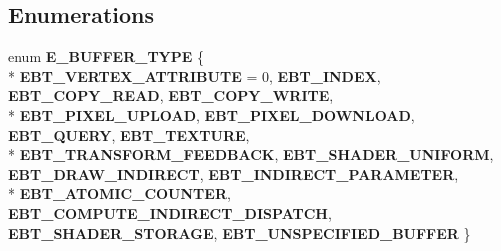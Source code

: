 \subsection*{Enumerations}
\begin{DoxyCompactItemize}
\item 
enum {\bfseries E\+\_\+\+B\+U\+F\+F\+E\+R\+\_\+\+T\+Y\+PE} \{ \\*
{\bfseries E\+B\+T\+\_\+\+V\+E\+R\+T\+E\+X\+\_\+\+A\+T\+T\+R\+I\+B\+U\+TE} = 0, 
{\bfseries E\+B\+T\+\_\+\+I\+N\+D\+EX}, 
{\bfseries E\+B\+T\+\_\+\+C\+O\+P\+Y\+\_\+\+R\+E\+AD}, 
{\bfseries E\+B\+T\+\_\+\+C\+O\+P\+Y\+\_\+\+W\+R\+I\+TE}, 
\\*
{\bfseries E\+B\+T\+\_\+\+P\+I\+X\+E\+L\+\_\+\+U\+P\+L\+O\+AD}, 
{\bfseries E\+B\+T\+\_\+\+P\+I\+X\+E\+L\+\_\+\+D\+O\+W\+N\+L\+O\+AD}, 
{\bfseries E\+B\+T\+\_\+\+Q\+U\+E\+RY}, 
{\bfseries E\+B\+T\+\_\+\+T\+E\+X\+T\+U\+RE}, 
\\*
{\bfseries E\+B\+T\+\_\+\+T\+R\+A\+N\+S\+F\+O\+R\+M\+\_\+\+F\+E\+E\+D\+B\+A\+CK}, 
{\bfseries E\+B\+T\+\_\+\+S\+H\+A\+D\+E\+R\+\_\+\+U\+N\+I\+F\+O\+RM}, 
{\bfseries E\+B\+T\+\_\+\+D\+R\+A\+W\+\_\+\+I\+N\+D\+I\+R\+E\+CT}, 
{\bfseries E\+B\+T\+\_\+\+I\+N\+D\+I\+R\+E\+C\+T\+\_\+\+P\+A\+R\+A\+M\+E\+T\+ER}, 
\\*
{\bfseries E\+B\+T\+\_\+\+A\+T\+O\+M\+I\+C\+\_\+\+C\+O\+U\+N\+T\+ER}, 
{\bfseries E\+B\+T\+\_\+\+C\+O\+M\+P\+U\+T\+E\+\_\+\+I\+N\+D\+I\+R\+E\+C\+T\+\_\+\+D\+I\+S\+P\+A\+T\+CH}, 
{\bfseries E\+B\+T\+\_\+\+S\+H\+A\+D\+E\+R\+\_\+\+S\+T\+O\+R\+A\+GE}, 
{\bfseries E\+B\+T\+\_\+\+U\+N\+S\+P\+E\+C\+I\+F\+I\+E\+D\+\_\+\+B\+U\+F\+F\+ER}
 \}\hypertarget{namespaceirr_1_1core_a26940079fc81a9813f555aef30e86472}{}\label{namespaceirr_1_1core_a26940079fc81a9813f555aef30e86472}


\end{DoxyCompactItemize}
